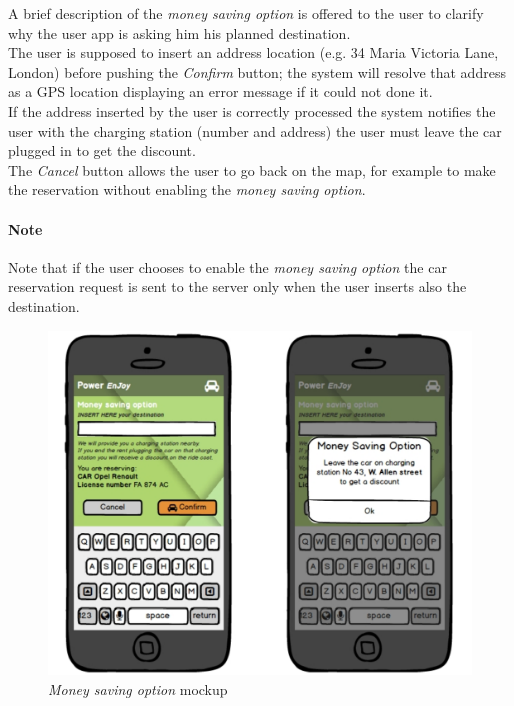 A brief description of the \emph{money saving option} is offered to the user to clarify why the user app is asking him his planned destination. \\

The user is supposed to insert an address location (e.g. 34 Maria Victoria Lane, London) before pushing the \emph{Confirm} button; the system will resolve that address as a GPS location displaying an error message if it could not done it. \\

If the address inserted by the user is correctly processed the system notifies the user with the charging station (number and address) 
the user must leave the car plugged in to get the discount. \\

The \emph{Cancel} button allows the user to go back on the map, for example to make the reservation without enabling the \emph{money saving option}.

\paragraph{Note} Note that if the user chooses to enable the \emph{money saving option} the car reservation request is sent to the server only when the user inserts also the destination.

\begin{figure}[h]
			\centering
			\includegraphics[width=0.9\linewidth]{mockups/moneySavingOption}
			\caption{
				\label{fig:msOption} 
				\emph{Money saving option} mockup
			}
		\end{figure}

